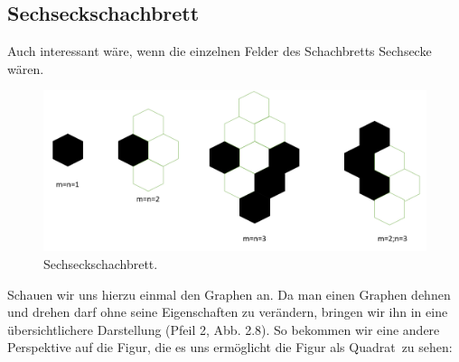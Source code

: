 \documentclass[11pt,a4paper]{article}
\numberwithin{equation}{section}
\numberwithin{table}{section}
\numberwithin{figure}{section}
\begin{document}
\subsection{Sechseckschachbrett}
Auch interessant wäre, wenn die einzelnen Felder des Schachbretts Sechsecke wären. 
\begin{center}
\begin{figure}[H]\label{bild7}
\begin{center}\includegraphics[scale=0.3]{7}
\caption{Sechseckschachbrett.}\end{center}
\end{figure}
\end{center}

\par\noindent Schauen wir uns hierzu einmal den Graphen an. Da man einen Graphen dehnen und drehen darf ohne seine Eigenschaften zu verändern, bringen wir ihn in eine übersichtlichere Darstellung (Pfeil 2, Abb. 2.8). So bekommen wir eine andere Perspektive auf die Figur, die es uns ermöglicht die Figur als \glqq Quadrat\grqq~zu sehen: 
\
\end{document}
